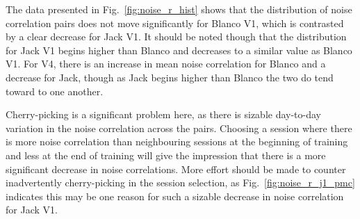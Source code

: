 The data presented in Fig.~\ref{fig:noise_r_hist} shows that the distribution of noise correlation pairs does not move significantly for Blanco \ac{V1}, which is contrasted by a clear decrease for Jack \ac{V1}. It should be noted though that the distribution for Jack \ac{V1} begins higher than Blanco and decreases to a similar value as Blanco \ac{V1}. For \ac{V4}, there is an increase in mean noise correlation for Blanco and a decrease for Jack, though as Jack begins higher than Blanco the two do tend toward to one another.

Cherry-picking is a significant problem here, as there is sizable day-to-day variation in the noise correlation across the pairs. Choosing a session where there is more noise correlation than neighbouring sessions at the beginning of training and less at the end of training will give the impression that there is a more significant decrease in noise correlations. More effort should be made to counter inadvertently cherry-picking in the session selection, as Fig.~\ref{fig:noise_r_j1_pmc} indicates this may be one reason for such a sizable decrease in noise correlation for Jack \ac{V1}.

